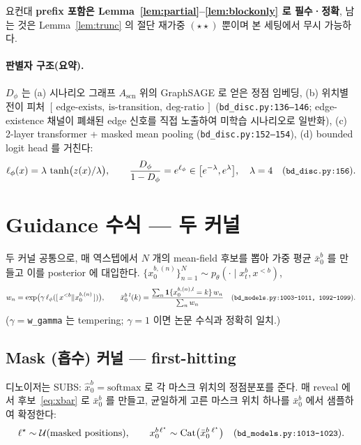 \documentclass[11pt]{article}
\newcommand{\code}[1]{\texttt{\small #1}}
\newcommand{\xpre}{x^{<b}}        %
\newcommand{\xblk}{x^{b}}         %
\newcommand{\pth}{p_\theta}
\newcommand{\Dphi}{D_\phi}
\newcommand{\xbar}{\bar{x}}
\DeclareMathOperator{\Cat}{Cat}
\theoremstyle{plain}
\theoremstyle{definition}
\begin{document}
\noindent 요컨대 \textbf{prefix 포함은 Lemma~\ref{lem:partial}--\ref{lem:blockonly} 로 필수·정확},
남는 것은 Lemma~\ref{lem:trunc} 의 절단 재가중 $(\star\star)$ 뿐이며 본 세팅에서 무시 가능하다.

\paragraph{판별자 구조(요약).} $\Dphi$ 는 (a) 시나리오 그래프 $A_\mathrm{scn}$ 위의
GraphSAGE 로 얻은 정점 임베딩, (b) 위치별 전이 피처
$[\,\text{edge-exists},\ \text{is-transition},\ \text{deg-ratio}\,]$
(\code{bd\_disc.py:136--146}; edge-existence 채널이 폐쇄된 edge 신호를 직접 노출하여
미학습 시나리오로 일반화), (c) 2-layer transformer + masked mean pooling
(\code{bd\_disc.py:152--154}), (d) bounded logit head 를 거친다:
\begin{equation}
\ell_\phi(x)=\lambda\,\tanh\!\big(z(x)/\lambda\big),\qquad
\frac{\Dphi}{1-\Dphi}=e^{\ell_\phi}\in\big[e^{-\lambda},e^{\lambda}\big],\quad \lambda=4
\quad(\code{bd\_disc.py:156}).
\end{equation}

\section{Guidance 수식 — 두 커널}

두 커널 공통으로, 매 역스텝에서 $N$ 개의 mean-field 후보를 뽑아
가중 평균 $\xbar^b_0$ 를 만들고 이를 posterior 에 대입한다.
$\{x^{b,(n)}_0\}_{n=1}^N \sim \pth(\cdot\mid\xblk_t,\xpre)$,
\begin{equation}
w_n=\exp\!\big(\gamma\,\ell_\phi([\,\xpre\Vert x^{b,(n)}_0\,])\big),\qquad
\bar{x}^{b}_{0}{}^{\,l}(k)=\frac{\sum_{n} \mathbf{1}\{x^{b,(n),l}_0=k\}\,w_n}{\sum_{n} w_n}
\quad(\code{bd\_models.py:1003--1011,\ 1092--1099}).
\label{eq:xbar}
\end{equation}
($\gamma=$\code{w\_gamma} 는 tempering; $\gamma=1$ 이면 논문 수식과 정확히 일치.)

\subsection{Mask (흡수) 커널 — first-hitting}
디노이저는 SUBS: $\hat{x}^{b}_0=\mathrm{softmax}$ 로 각 마스크 위치의 정점분포를 준다.
매 reveal 에서 후보~\eqref{eq:xbar} 로 $\xbar^b_0$ 를 만들고,
균일하게 고른 마스크 위치 하나를 $\xbar^b_0$ 에서 샘플하여 확정한다:
\begin{equation}
\ell^\star\sim \mathcal{U}(\text{masked positions}),\qquad
x^{b}_{0}{}^{\ell^\star}\sim \Cat\!\big(\xbar^{b}_{0}{}^{\,\ell^\star}\big)
\quad(\code{bd\_models.py:1013--1023}).
\end{equation}
\end{document}
